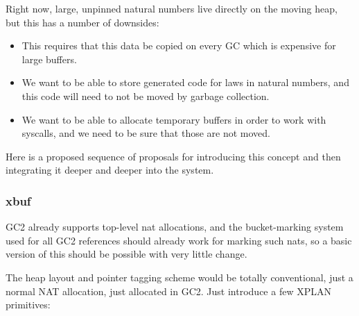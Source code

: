 Right now, large, unpinned natural numbers live directly on the moving
heap, but this has a number of downsides:

\begin{itemize}
\item
  This requires that this data be copied on every GC which is
  expensive for large buffers.
\item
  We want to be able to store generated code for laws in natural numbers,
  and this code will need to not be moved by garbage collection.
\item
  We want to be able to allocate temporary buffers in order to work
  with syscalls, and we need to be sure that those are not moved.
\end{itemize}

Here is a proposed sequence of proposals for introducing this concept
and then integrating it deeper and deeper into the system.

\subsubsection{xbuf}

GC2 already supports top-level nat allocations, and the bucket-marking
system used for all GC2 references should already work for marking
such nats, so a basic version of this should be possible with very
little change.

The heap layout and pointer tagging scheme would be totally conventional,
just a normal NAT allocation, just allocated in GC2.  Just introduce a
few XPLAN primitives:

